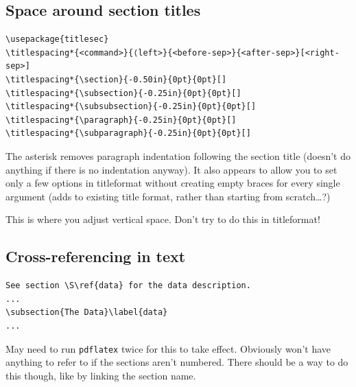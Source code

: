 \documentclass{article}
\begin{document}
\subsection{Space around section titles}
\begin{minipage}[t]{\textwidth}
\begin{lstlisting}
\usepackage{titlesec}
\titlespacing*{<command>}{⟨left>}{<before-sep>}{<after-sep>}[<right-sep>]
\titlespacing*{\section}{-0.50in}{0pt}{0pt}[]
\titlespacing*{\subsection}{-0.25in}{0pt}{0pt}[]
\titlespacing*{\subsubsection}{-0.25in}{0pt}{0pt}[]
\titlespacing*{\paragraph}{-0.25in}{0pt}{0pt}[]
\titlespacing*{\subparagraph}{-0.25in}{0pt}{0pt}[]
\end{lstlisting}
\end{minipage}
\begin{minipage}[t]{\textwidth}
    The asterisk removes paragraph indentation following the section title
    (doesn't do anything if there is no indentation anyway). It also appears to
    allow you to set only a few options in titleformat without creating empty
    braces for every single argument (adds to existing title format, rather
    than starting from scratch\ldots?)

    This is where you adjust vertical space. Don't try to do this in titleformat!
\end{minipage}

\subsection{Cross-referencing in text}
\begin{lstlisting}
See section \S\ref{data} for the data description.
...
\subsection{The Data}\label{data}
...
\end{lstlisting}
May need to run \texttt{pdflatex} twice for this to take effect.
Obviously won't have anything to refer to if the sections aren't numbered.
There should be a way to do this though, like by linking the section name.
\end{document}
